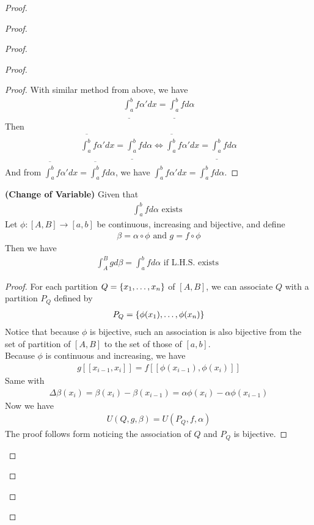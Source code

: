 \documentclass{report}
\begin{document}
\begin{proof}
\begin{proof}
\begin{proof}
\begin{proof}
\begin{proof}
With similar method from above, we have 
\begin{align*}
\underline{\int_a^b}f\alpha 'dx=\underline{\int_a^b}fd\alpha 
\end{align*}
Then 
\begin{align*}
\overline{\int_a^b}f\alpha 'dx=\underline{\int_a^b}fd\alpha \iff  \overline{\int_a^b}f\alpha 'dx=\underline{\int_a^b}fd\alpha 
\end{align*}
And from $\overline{\int_a^b}f\alpha 'dx=\overline{\int_a^b}fd\alpha $, we have $\int_a^b f\alpha 'dx =\int_a^b fd\alpha $. 
\end{proof}
\begin{theorem}
\textbf{(Change of Variable)} Given that 
\begin{align*}
\int_a^b fd\alpha \text{ exists }
\end{align*}
Let $\phi:[A,B]\to [a,b]$ be continuous, increasing and bijective, and define 
\begin{align*}
\beta = \alpha \circ  \phi \text{ and }g = f \circ  \phi 
\end{align*}
Then we have 
\begin{align*}
\int_A^B g d \beta =\int_a^b fd\alpha \text{ if L.H.S. exists }
\end{align*}
\end{theorem}
\begin{proof}
For each partition $Q=\{ x_1,\dots ,x_n \}$ of  $[A,B]$, we can associate $Q$ with a partition $P_Q$ defined by 
 \begin{align*}
P_Q=\{ \phi (x_1) ,\dots ,\phi (x_n) \}
\end{align*}
Notice that because $\phi$ is bijective, such an association is also bijective from the set of partition of $[A,B]$ to the set of those of $[a,b]$.\\ 

Because $\phi$ is continuous and increasing, we have  
\begin{align*}
  g[[x_{i-1},x_i]]=f [[\phi (x_{i-1}), \phi (x_i)]]
\end{align*}
Same with 
\begin{align*}
\Delta \beta (x_i)=\beta (x_i)-\beta  (x_{i-1})= \alpha \phi (x_i)-\alpha \phi (x_{i-1})
\end{align*}
Now we have 
\begin{align*}
U(Q,g,\beta )= U(P_Q,f,\alpha )
\end{align*}
The proof follows form noticing the association of $Q$ and  $P_Q$ is bijective. 


\end{proof}
\end{proof}
\end{proof}
\end{proof}
\end{proof}
\end{document}

